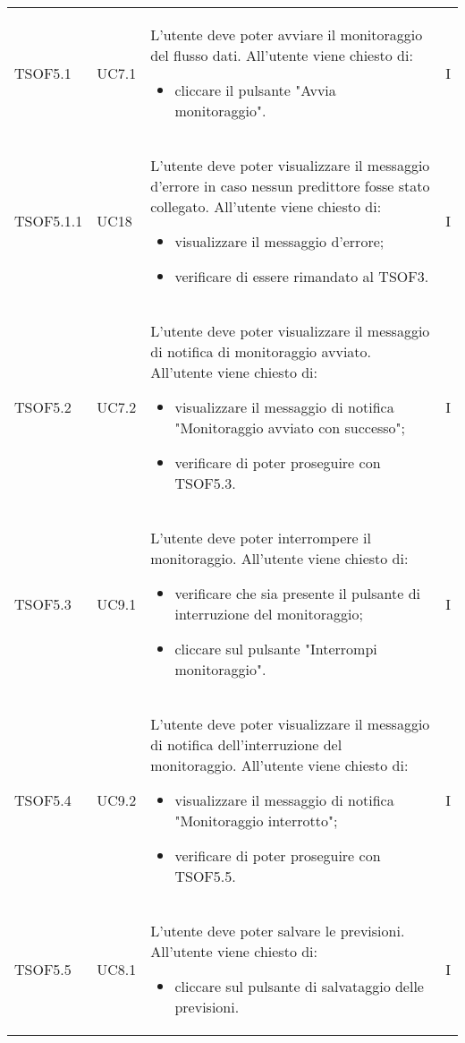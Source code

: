 \begin{longtable}{C{2.5cm} C{2.5cm} L{8cm} C{2cm}}
TSOF5.1 &
UC7.1 &
L'utente deve poter avviare il monitoraggio del flusso dati. All'utente viene chiesto di:
\begin{itemize}
	\item cliccare il pulsante "Avvia monitoraggio".
\end{itemize}&
I \\

TSOF5.1.1 &
UC18 &
L'utente deve poter visualizzare il messaggio d'errore in caso nessun predittore fosse stato collegato. All'utente viene chiesto di:
\begin{itemize}
	\item visualizzare il messaggio d'errore;
	\item verificare di essere rimandato al TSOF3.
\end{itemize}&
I \\

TSOF5.2 &
UC7.2 &
L'utente deve poter visualizzare il messaggio di notifica di monitoraggio avviato. All'utente viene chiesto di:
\begin{itemize}
	\item visualizzare il messaggio di notifica "Monitoraggio avviato con successo";
	\item verificare di poter proseguire con TSOF5.3.
\end{itemize}&
I \\

TSOF5.3 &
UC9.1 &
L'utente deve poter interrompere il monitoraggio. All'utente viene chiesto di:
\begin{itemize}
	\item verificare che sia presente il pulsante di interruzione del monitoraggio;
	\item cliccare sul pulsante "Interrompi monitoraggio".
\end{itemize}&
I \\

TSOF5.4 &
UC9.2 &
L'utente deve poter visualizzare il messaggio di notifica dell'interruzione del monitoraggio. All'utente viene chiesto di:
\begin{itemize}
	\item visualizzare il messaggio di notifica "Monitoraggio interrotto";
	\item verificare di poter proseguire con TSOF5.5.
\end{itemize}&
I \\

TSOF5.5 &
UC8.1 &
L'utente deve poter salvare le previsioni. All'utente viene chiesto di:
\begin{itemize}
	\item cliccare sul pulsante di salvataggio delle previsioni.
\end{itemize}&
I \\


\end{longtable}
